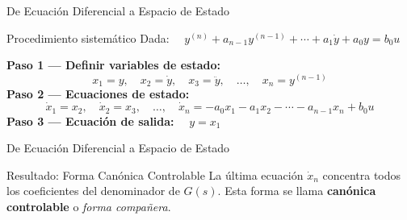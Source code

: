 \documentclass[aspectratio=169,xcolor=dvipsnames]{beamer}
\begin{document}
\begin{frame}{De Ecuaci\'on Diferencial a Espacio de Estado}
    \begin{exampleblock}{Procedimiento sistem\'atico}
        Dada: $\quad y^{(n)} + a_{n-1}y^{(n-1)} + \cdots + a_1\dot{y} + a_0 y = b_0 u$
    \end{exampleblock}
    \vspace{0.3em}
    \textbf{Paso 1 --- Definir variables de estado:}
    \begin{equation}
        x_1 = y, \quad x_2 = \dot{y}, \quad x_3 = \ddot{y}, \quad \ldots, \quad x_n = y^{(n-1)}
    \end{equation}
    \textbf{Paso 2 --- Ecuaciones de estado:}
    \[
        \dot{x}_1 = x_2, \quad \dot{x}_2 = x_3, \quad \ldots, \quad \dot{x}_n = -a_0 x_1 - a_1 x_2 - \cdots - a_{n-1} x_n + b_0 u
    \]
    \textbf{Paso 3 --- Ecuaci\'on de salida:} $\quad y = x_1$
\end{frame}
\begin{frame}{De Ecuaci\'on Diferencial a Espacio de Estado}
    \begin{block}{Resultado: Forma Can\'onica Controlable}
        La \'ultima ecuaci\'on $\dot{x}_n$ concentra todos los coeficientes del denominador de $G(s)$. Esta forma se llama \textbf{can\'onica controlable} o \textit{forma compa\~nera}.
    \end{block}
\end{frame}
\end{document}
